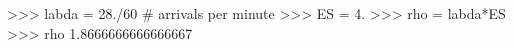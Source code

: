 
>>> labda = 28./60 # arrivals per minute
>>> ES = 4.
>>> rho = labda*ES
>>> rho
1.8666666666666667

